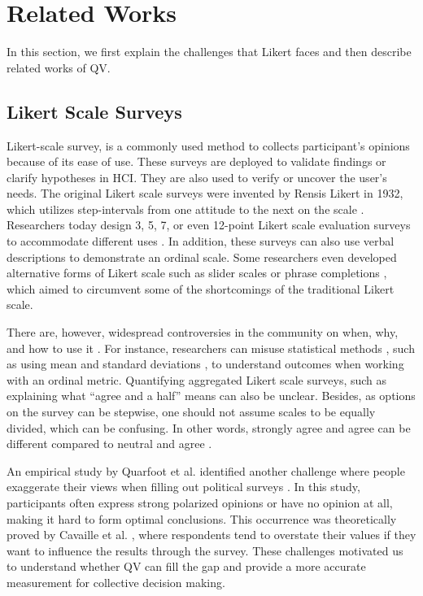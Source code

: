 \section{Related Works} \label{related_works}
In this section, 
we first explain the challenges
that Likert faces
and then describe related works of QV.

\subsection{Likert Scale Surveys}
Likert-scale survey, 
is a commonly used method 
to collects participant's opinions
because of its ease of use.
These surveys are deployed
to validate findings or clarify hypotheses
\cite{ozok2009survey, ledo2018evaluation} in HCI.
They are also used to verify or uncover the user's needs.
The original Likert scale surveys
were invented by Rensis Likert in 1932, 
which utilizes step-intervals 
from one attitude to the next 
on the scale \cite{likert1932technique}.
Researchers today design 3, 5, 7, 
or even 12-point Likert scale evaluation surveys to accommodate different uses
\cite{garland2008computer,finstad2010}.
In addition, these surveys
can also use verbal descriptions
to demonstrate an ordinal scale.
Some researchers even developed 
alternative forms of Likert scale 
such as slider scales \cite{roster2015exploring} 
or phrase completions \cite{hodge2003phrase}, 
which aimed to circumvent 
some of the shortcomings of the traditional Likert scale.

There are, however, widespread controversies in the community on
when, why, and how to use it \cite{bishop2015use}.
For instance, 
researchers can misuse statistical methods
, such as using mean and standard deviations \cite{jamieson2004likert},
to understand outcomes
when working with an ordinal metric.
Quantifying aggregated Likert scale surveys,
such as explaining what ``agree and a half'' means
can also be unclear.
Besides, 
as options on the survey can be stepwise,
one should not assume scales to be equally divided,
which can be confusing.
In other words, 
strongly agree and agree can be different compared to
neutral and agree \cite{jamieson2004likert, edmondson2005likert}.

An empirical study by Quarfoot et al.
identified another challenge
where people exaggerate their views
when filling out political surveys
\cite{quarfoot2017quadratic}.
In this study,
participants often express strong polarized opinions
or have no opinion at all,
making it hard to form optimal conclusions\cite{posner2018radical}.
This occurrence was 
theoretically proved by Cavaille et al. \cite{cavaille2018towards},
where respondents tend to overstate their values
if they want to influence the results through the survey.
These challenges motivated us 
to understand whether QV can fill the gap
and provide a more accurate measurement
for collective decision making.\par

